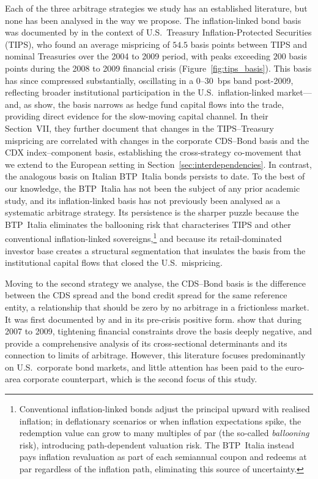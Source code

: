 Each of the three arbitrage strategies we study has an established
literature, but none has been analysed in the way we propose. The
inflation-linked bond basis was documented by
\citet{fleckenstein2014tips} in the context of U.S.\ Treasury
Inflation-Protected Securities (TIPS), who found an average mispricing
of $54.5$ basis points between TIPS and nominal Treasuries over the
2004 to 2009 period, with peaks exceeding $200$ basis points during
the 2008 to 2009 financial crisis
(Figure~\ref{fig:tips_basis}). This basis has since compressed
substantially, oscillating in a 0--30~bps band post-2009, reflecting
broader institutional participation in the U.S.\ inflation-linked
market---and, as \citet{fleckenstein2014tips} show, the basis narrows
as hedge fund capital flows into the trade, providing direct evidence
for the slow-moving capital channel. In their Section~VII, they
further document that changes in the TIPS--Treasury mispricing are
correlated with changes in the corporate CDS--Bond basis and the CDX
index--component basis, establishing the cross-strategy co-movement
that we extend to the European setting in
Section~\ref{sec:interdependencies}. In contrast, the analogous basis
on Italian BTP~Italia bonds persists to date. To the best of our
knowledge, the BTP~Italia has not been the subject of any prior
academic study, and its inflation-linked basis has not previously
been analysed as a systematic arbitrage strategy. Its persistence is
the sharper puzzle because the BTP~Italia eliminates the ballooning
risk that characterises TIPS and other conventional inflation-linked
sovereigns,\footnote{Conventional inflation-linked bonds adjust the
principal upward with realised inflation; in deflationary scenarios
or when inflation expectations spike, the redemption value can grow
to many multiples of par (the so-called \emph{ballooning} risk),
introducing path-dependent valuation risk. The BTP~Italia instead
pays inflation revaluation as part of each semiannual coupon and
redeems at par regardless of the inflation path, eliminating this
source of uncertainty.} and because its retail-dominated investor base
creates a structural segmentation that insulates the basis from the
institutional capital flows that closed the U.S.\ mispricing.

Moving to the second strategy we analyse, the CDS--Bond basis is the
difference between the CDS spread and the bond credit spread for the
same reference entity, a relationship that should be zero by no
arbitrage in a frictionless market. It was first documented by
\citet{hull2004relationship} and \citet{longstaff2005corporate} in
its pre-crisis positive form. \citet{mitchell2012arbitrage} show that
during 2007 to 2009, tightening financial constraints drove the basis
deeply negative, and \citet{bai2019cds} provide a comprehensive
analysis of its cross-sectional determinants and its connection to
limits of arbitrage. However, this literature focuses predominantly
on U.S.\ corporate bond markets, and little attention has been paid
to the euro-area corporate counterpart, which is the second focus of
this study.

